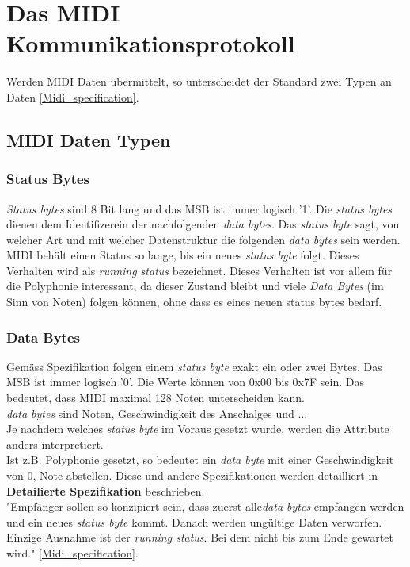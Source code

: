 \newpage
\section{Das MIDI Kommunikationsprotokoll}\label{sect.midi_spezification}
Werden MIDI Daten übermittelt, so unterscheidet der Standard zwei Typen an Daten \ref{Midi_specification}.

\subsection{MIDI Daten Typen}
\subsubsection*{Status Bytes}
\textit{Status bytes} sind 8 Bit lang und das MSB ist immer logisch '1'. Die \textit{status bytes} dienen dem Identifizerein der nachfolgenden \textit{data bytes}. Das \textit{status byte} sagt, von welcher Art und mit welcher Datenstruktur die folgenden \textit{data bytes} sein werden.\\
MIDI behält einen Status so lange, bis ein neues \textit{status byte} folgt. Dieses Verhalten wird als \textit{running status} bezeichnet. Dieses Verhalten ist vor allem für die Polyphonie interessant, da dieser Zustand bleibt und viele \textit{Data Bytes} (im Sinn von Noten) folgen können, ohne dass es eines neuen status bytes bedarf.\\

\subsubsection*{Data Bytes}
Gemäss Spezifikation folgen einem \textit{status byte} exakt ein oder zwei Bytes. Das MSB ist immer logisch '0'. Die Werte können von 0x00 bis 0x7F sein. Das bedeutet, dass MIDI maximal 128 Noten unterscheiden kann.\\
\textit{data bytes} sind Noten, Geschwindigkeit des Anschalges und ...\\
Je nachdem welches \textit{status byte} im Voraus gesetzt wurde, werden die Attribute anders interpretiert.\\
Ist z.B. Polyphonie gesetzt, so bedeutet ein \textit{data byte} mit einer Geschwindigkeit von 0, Note abstellen. Diese und andere Spezifikationen werden detailliert in \textbf{Detailierte Spezifikation} beschrieben.
\\
"Empfänger sollen so konzipiert sein, dass zuerst alle\textit{data bytes} empfangen werden und ein neues \textit{status byte} kommt. Danach werden ungültige Daten verworfen. Einzige Ausnahme ist der \textit{running status}. Bei dem nicht bis zum Ende gewartet wird." \ref{Midi_specification}.\\


